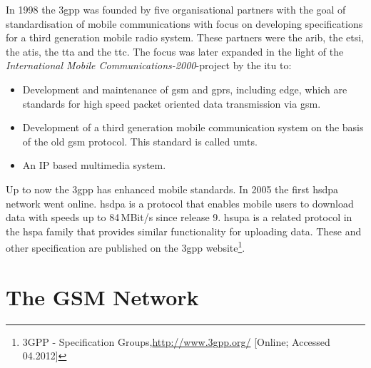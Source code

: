 In 1998 the \gls{3gpp} was founded by five organisational partners with the goal of standardisation of mobile communications with focus on developing specifications for a third generation mobile radio system.
These partners were the \gls{arib}, the \gls{etsi}, the \gls{atis}, the \gls{tta} and the \gls{ttc}.
The focus was later expanded in the light of the \emph{International Mobile Communications-2000}-project \cite{3gpp_Proposal2000} by the \gls{itu} to:
\begin{itemize}
	\item Development and maintenance of \gls{gsm} and \gls{gprs}, including \gls{edge}, which are standards for high speed packet oriented data transmission via \gls{gsm}.
	\item Development of a third generation mobile communication system on the basis of the old \gls{gsm} protocol. This standard is called \gls{umts}.
	\item An IP based multimedia system.
\end{itemize}
Up to now the \gls{3gpp} has enhanced mobile standards.
In 2005 the first \gls{hsdpa} network went online.
\gls{hsdpa} \cite{hsdpa} is a protocol that enables mobile users to download data with speeds up to 84\,MBit/s since release 9.
\gls{hsupa} \cite{hsupa} is a related protocol in the \gls{hspa} family that provides similar functionality for uploading data.
These and other specification are published on the \gls{3gpp} website\footnote{3GPP - Specification Groups,\url{http://www.3gpp.org/} [Online; Accessed 04.2012]}.

\section{The GSM Network}
\label{sec:network}

